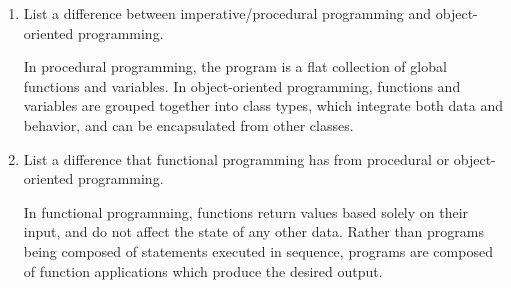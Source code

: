 \begin{enumerate}

\item List a difference between imperative/procedural programming and object-oriented programming.

\begin{answer}
In procedural programming, the program is a flat collection of global functions and variables. In object-oriented programming, functions and variables are grouped together into class types, which integrate both data and behavior, and can be encapsulated from other classes.
\end{answer}


\item List a difference that functional programming has from procedural or object-oriented programming.

\begin{answer}
In functional programming, functions return values based solely on their input, and do not affect the state of any other data. Rather than programs being composed of statements executed in sequence, programs are composed of function applications which produce the desired output.
\end{answer}

\end{enumerate}
